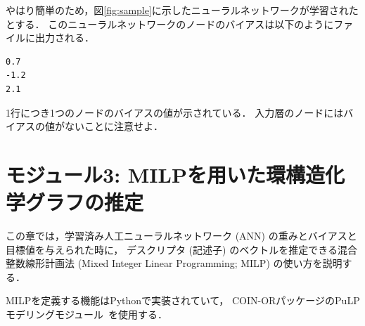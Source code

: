 \documentclass[11pt,titlepage,dvipdfmx,twoside]{jsbook}
\newcommand{\figref}[1]{図\ref{fig:#1}}
\newcommand{\target}{目標}
\begin{document}
やはり簡単のため，\figref{sample}に示したニューラルネットワークが学習されたとする．
このニューラルネットワークのノードのバイアスは以下のようにファイルに出力される．

\begin{oframed}
{\small
\begin{verbatim}
0.7
-1.2
2.1
\end{verbatim}
}
\end{oframed}
1行につき1つのノードのバイアスの値が示されている．
入力層のノードにはバイアスの値がないことに注意せよ．

\chapter{モジュール3: MILPを用いた環構造化学グラフの推定}
\label{chap:3Intro}

この章では，学習済み人工ニューラルネットワーク (ANN) の重みとバイアスと\target 値を与えられた時に，
デスクリプタ (記述子) のベクトルを推定できる混合整数線形計画法 (Mixed Integer Linear Programming; MILP) の使い方を説明する．

MILPを定義する機能はPythonで実装されていて，
COIN-ORパッケージのPuLPモデリングモジュール~\cite{PuLP1,PuLP2,PuLP3,PuLP4}を使用する．
\end{document}
